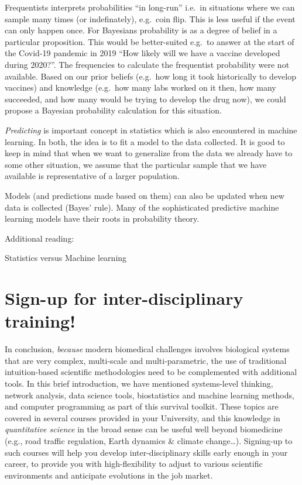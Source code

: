 \documentclass[
]{book}
\begin{document}
Frequentists interprets probabilities ``in long-run'' i.e.~in situations where we can sample many times (or indefinately), e.g.~coin flip. This is less useful if the event can only happen once. For Bayesians probability is as a degree of belief in a particular proposition. This would be better-suited e.g.~to answer at the start of the Covid-19 pandemic in 2019 ``How likely will we have a vaccine developed during 2020?''. The frequencies to calculate the frequentist probability were not available. Based on our prior beliefs (e.g.~how long it took historically to develop vaccines) and knowledge (e.g.~how many labs worked on it then, how many succeeded, and how many would be trying to develop the drug now), we could propose a Bayesian probability calculation for this situation.

\emph{Predicting} is important concept in statistics which is also encountered in machine learning. In both, the idea is to fit a model to the data collected. It is good to keep in mind that when we want to generalize from the data we already have to some other situation, we assume that the particular sample that we have available is representative of a larger population.

Models (and predictions made based on them) can also be updated when new data is collected (Bayes' rule). Many of the sophisticated predictive machine learning models have their roots in probability theory.

Additional reading:

Statistics versus Machine learning

\hypertarget{sign-up-for-inter-disciplinary-training}{%
\chapter{Sign-up for inter-disciplinary training!}\label{sign-up-for-inter-disciplinary-training}}

In conclusion, \emph{because} modern biomedical challenges involves biological systems that are very complex, multi-scale and multi-parametric, the use of traditional intuition-based scientific methodologies need to be complemented with additional tools. In this brief introduction, we have mentioned systems-level thinking, network analysis, data science tools, biostatistics and machine learning methods, and computer programming as part of this survival toolkit.
These topics are covered in several courses provided in your University, and this knowledge in \emph{quantitative science} in the broad sense can be useful well beyond biomedicine (e.g., road traffic regulation, Earth dynamics \& climate change\ldots). Signing-up to such courses will help you develop inter-disciplinary skills early enough in your career, to provide you with high-flexibility to adjust to various scientific environments and anticipate evolutions in the job market.
\end{document}
